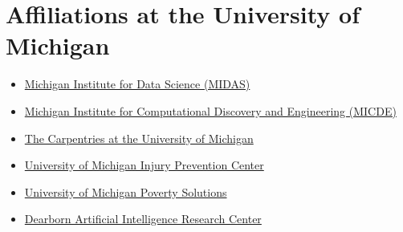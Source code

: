 \documentclass[11pt]{article}
\newenvironment{main}
{\begin{adjustwidth}{3em}{}}
{\end{adjustwidth}}
\begin{document}
\section*{Affiliations at the University of Michigan}
\begin{main}

\begin{itemize}
    \item \href{https://midas.umich.edu/}{Michigan Institute for Data Science (MIDAS)}
    \item \href{https://micde.umich.edu/}{Michigan Institute for Computational Discovery and Engineering (MICDE)}
    \item \href{https://umcarpentries.org/}{The Carpentries at the University of Michigan}
    \item \href{https://injurycenter.umich.edu/}{University of Michigan Injury Prevention Center}
    \item \href{https://poverty.umich.edu/}{University of Michigan Poverty Solutions}
    \item \href{https://umdearborn.edu/cecs/research/centers/dearborn-artificial-intelligence-research-dair-center}{Dearborn Artificial Intelligence Research Center}
\end{itemize}


\end{main}
\end{document}
